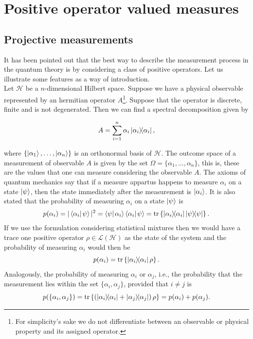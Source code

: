 \documentclass[10pt, a4paper]{amsart}
\begin{document}
\section{Positive operator valued measures} %
\label{sec:introduction}



\subsection{Projective measurements}
\label{subsection:projection_measurements}

It has been pointed out that the best way to describe the measurement process in the quantum theory is by considering a class of positive operators. Let us illustrate some features as a way of introduction. \\

Let $\mathcal{H} $ be a $n$-dimensional Hilbert space. Suppose we have a physical observable represented by an hermitian operator $A$\footnote{For simplicity's sake we do not differentiate between an observable or physical property and its assigned operator.}. Suppose that the operator is discrete,  finite and is not degenerated. Then we can find a spectral decomposition given by 

\begin{equation}\label{eq:finite_sharp_observable_selfadjoint}
A = \sum_{i=1}^{n} \alpha _{i}\left| \alpha _{i}\right\rangle\!\!\left\langle \alpha _{i}\right|, 
\end{equation}  

where $\{\left| \alpha_1\right\rangle,\ldots, \left| \alpha_n\right\rangle \}$ is an orthonormal basis of $\mathcal{H}$.
The outcome space of a measurement of observable $A$ is given by the set $\Omega = \{\alpha_1, \ldots , \alpha_n\}$, this is, these are the values that one can measure considering the observable $A$. The axioms of quantum mechanics say that if a measure appartus happens to measure $\alpha_i$ on a state $\left| \psi\right\rangle$, then the state immediately after the measurement is $\left| \alpha_i\right\rangle$. It is also stated that the probability of measuring $\alpha_i$ on a state $\left| \psi\right\rangle$ is 
$$
p(\alpha_{i}) =
|\left \langle \alpha_i \right|\left.\! \psi\right\rangle|^2 = \left \langle \psi \right|\left.\! \alpha_i\right\rangle\left \langle \alpha_i \right|\left.\! \psi\right\rangle
=
\mathrm{tr} \left\{ \left| \alpha_i\right\rangle\!\!\left\langle \alpha_i\right|\left| \psi\right\rangle\!\!\left\langle \psi\right| \right\}.
$$
If we use the formulation considering statistical mixtures then we would have a trace one positive operator $\rho \in \mathcal{L}(\mathcal{H})$ as the state of the system and the probability of measuring $\alpha_{i}$ would then be 
\[
p(\alpha_{i}) =
\mathrm{tr} \left \{ 
\left| \alpha_{i}\right\rangle\!\!\left\langle \alpha_{i}\right| \rho
\right \}.
\]
Analogously, the probability of measuring $\alpha_{i}$ or $\alpha_{j}$, i.e., the probability that the measurement lies within the set $\{\alpha_{i}, \alpha_{j}\}$, provided that $i\neq j$ is 
\[
p(\{\alpha_{i}, \alpha_{j}\})=
\mathrm{tr}\left \{
\left (
\left| \alpha_{i}\right\rangle\!\!\left\langle \alpha_{i}\right|+\left| \alpha_{j}\right\rangle\!\!\left\langle \alpha_{j}\right|
\right )\rho
\right \}
=
p(\alpha_{i})
+
p(\alpha_{j}).
\]
\end{document}
